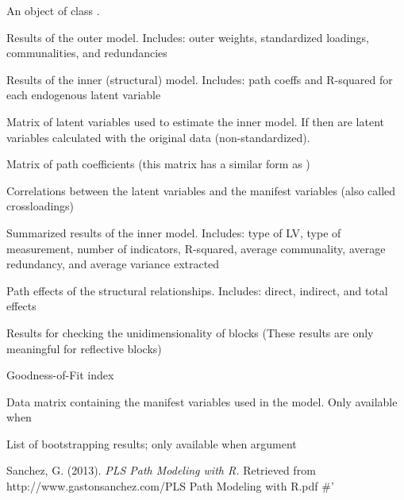 \documentclass[a4paper]{book}
\begin{document}
\begin{Value}
An object of class .

\begin{ldescription}
\item[\code{outer\_model}] Results of the outer model. Includes:
outer weights, standardized loadings, communalities, and redundancies

\item[\code{inner\_model}] Results of the inner (structural) model. 
Includes: path coeffs and R-squared for each endogenous latent variable

\item[\code{scores}] Matrix of latent variables used to estimate the inner
model. If  then  are latent variables
calculated with the original data (non-standardized).

\item[\code{path\_coefs}] Matrix of path coefficients 
(this matrix has a similar form as )

\item[\code{crossloadings}] Correlations between the latent variables 
and the manifest variables (also called crossloadings)

\item[\code{inner\_summary}] Summarized results of the inner model. 
Includes: type of LV, type of measurement, number of indicators, R-squared,
average communality, average redundancy, and average variance
extracted

\item[\code{effects}] Path effects of the structural relationships. 
Includes: direct, indirect, and total effects

\item[\code{unidim}] Results for checking the unidimensionality of blocks
(These results are only meaningful for reflective blocks)

\item[\code{gof}] Goodness-of-Fit index

\item[\code{data}] Data matrix containing the manifest variables used in the
model. Only available when 

\item[\code{boot}] List of bootstrapping results; only available 
when argument 
\end{ldescription}
\end{Value}
%
\begin{References}\relax
Sanchez, G. (2013). \emph{PLS Path Modeling with R.} Retrieved from http://www.gastonsanchez.com/PLS Path Modeling with R.pdf
\#'
\end{References}
\end{document}
